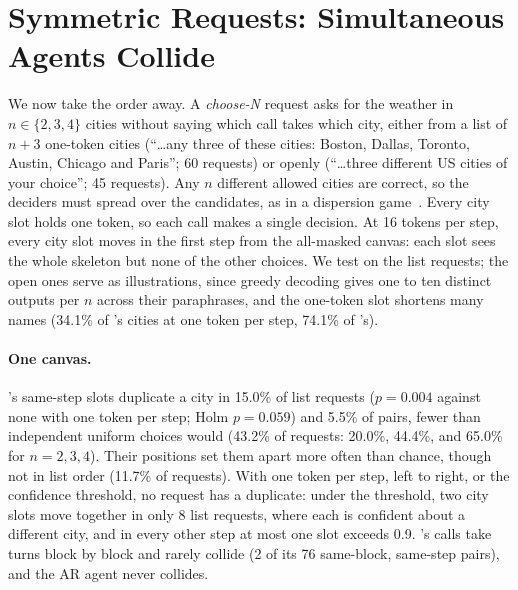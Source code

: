 \section{Symmetric Requests: Simultaneous Agents Collide}
\label{sec:symmetric}

We now take the order away. A \emph{choose-N} request asks for the weather in $n\in\{2,3,4\}$ cities without saying which call takes which city, either from a list of $n+3$ one-token cities (``\dots any three of these cities: Boston, Dallas, Toronto, Austin, Chicago and Paris''; 60 requests) or openly (``\dots three different US cities of your choice''; 45 requests). Any $n$ different allowed cities are correct, so the deciders must spread over the candidates, as in a dispersion game~\cite{grenager2002dispersion}. Every city slot holds one token, so each call makes a single decision. At 16 tokens per step, every city slot moves in the first step from the all-masked canvas: each slot sees the whole skeleton but none of the other choices. We test  on the list requests; the open ones serve as illustrations, since greedy decoding gives one to ten distinct outputs per $n$ across their paraphrases, and the one-token slot shortens many names (34.1\% of \dream's cities at one token per step, 74.1\% of \qwen's).

\paragraph{One canvas.} \dream's same-step slots duplicate a city in 15.0\% of list requests ($p=0.004$ against none with one token per step; Holm $p=0.059$) and 5.5\% of pairs, fewer than independent uniform choices would (43.2\% of requests: 20.0\%, 44.4\%, and 65.0\% for $n=2,3,4$). Their positions set them apart more often than chance, though not in list order (11.7\% of requests). With one token per step, left to right, or the confidence threshold, no request has a duplicate: under the threshold, two city slots move together in only 8 list requests, where each is confident about a different city, and in every other step at most one slot exceeds 0.9. \llada's calls take turns block by block and rarely collide (2 of its 76 same-block, same-step pairs), and the AR agent never collides.

